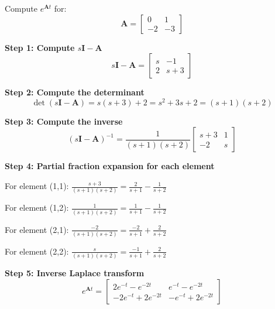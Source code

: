 \begin{example}
\label{ex:matrix_exp_laplace}
Compute $e^{\mathbf{A}t}$ for:
\begin{equation}
\mathbf{A} = \begin{bmatrix} 0 & 1 \\ -2 & -3 \end{bmatrix}
\end{equation}

\textbf{Step 1: Compute $s\mathbf{I} - \mathbf{A}$}
\begin{equation}
s\mathbf{I} - \mathbf{A} = \begin{bmatrix} s & -1 \\ 2 & s+3 \end{bmatrix}
\end{equation}

\textbf{Step 2: Compute the determinant}
\begin{equation}
\det(s\mathbf{I} - \mathbf{A}) = s(s+3) + 2 = s^2 + 3s + 2 = (s+1)(s+2)
\end{equation}

\textbf{Step 3: Compute the inverse}
\begin{equation}
(s\mathbf{I} - \mathbf{A})^{-1} = \frac{1}{(s+1)(s+2)}\begin{bmatrix} s+3 & 1 \\ -2 & s \end{bmatrix}
\end{equation}

\textbf{Step 4: Partial fraction expansion for each element}

For element (1,1): $\frac{s+3}{(s+1)(s+2)} = \frac{2}{s+1} - \frac{1}{s+2}$

For element (1,2): $\frac{1}{(s+1)(s+2)} = \frac{1}{s+1} - \frac{1}{s+2}$

For element (2,1): $\frac{-2}{(s+1)(s+2)} = \frac{-2}{s+1} + \frac{2}{s+2}$

For element (2,2): $\frac{s}{(s+1)(s+2)} = \frac{-1}{s+1} + \frac{2}{s+2}$

\textbf{Step 5: Inverse Laplace transform}
\begin{equation}
e^{\mathbf{A}t} = \begin{bmatrix} 2e^{-t} - e^{-2t} & e^{-t} - e^{-2t} \\ -2e^{-t} + 2e^{-2t} & -e^{-t} + 2e^{-2t} \end{bmatrix}
\end{equation}
\end{example}

